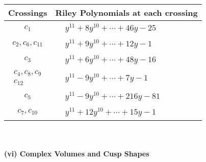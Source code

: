 \documentclass[1p]{elsarticle_modified}
\theoremstyle{definition}
\begin{document}
\begin{tabular}{m{50pt}|m{274pt}}
Crossings & \hspace{64pt}Riley Polynomials at each crossing \\
\hline $$\begin{aligned}c_{1}\end{aligned}$$&$\begin{aligned}
&y^{11}+8 y^{10}+\cdots+46 y-25
\end{aligned}$\\
\hline $$\begin{aligned}c_{2},c_{6},c_{11}\end{aligned}$$&$\begin{aligned}
&y^{11}+9 y^{10}+\cdots+12 y-1
\end{aligned}$\\
\hline $$\begin{aligned}c_{3}\end{aligned}$$&$\begin{aligned}
&y^{11}+6 y^{10}+\cdots+48 y-16
\end{aligned}$\\
\hline $$\begin{aligned}c_{4},c_{8},c_{9}\\c_{12}\end{aligned}$$&$\begin{aligned}
&y^{11}-9 y^{10}+\cdots+7 y-1
\end{aligned}$\\
\hline $$\begin{aligned}c_{5}\end{aligned}$$&$\begin{aligned}
&y^{11}-9 y^{10}+\cdots+216 y-81
\end{aligned}$\\
\hline $$\begin{aligned}c_{7},c_{10}\end{aligned}$$&$\begin{aligned}
&y^{11}+12 y^{10}+\cdots+15 y-1
\end{aligned}$\\
\hline
\end{tabular}\\~\\
\newpage\flushleft \textbf{(vi) Complex Volumes and Cusp Shapes}
\end{document}

